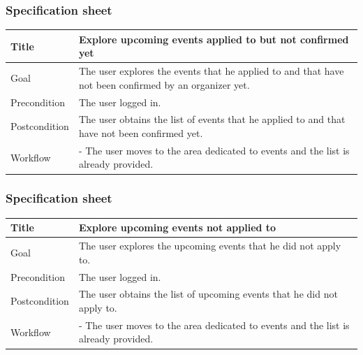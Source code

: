 \documentclass{beamer}
\begin{document}
\begin{frame}
    \frametitle{Specification sheet}
    \begin{table}
        \tiny
        \begin{tabular}{|p{2cm}|p{6cm}|}
        \hline
        Title & \textbf{Explore upcoming events applied to but not confirmed yet} \\
        \hline
        Goal & The user explores the events that he applied to 
        and that have not been confirmed by an organizer yet. \\
        \hline
        Precondition & The user logged in. \\
        \hline
        Postcondition & The user obtains the list of events that he 
        applied to and that have not been confirmed yet. \\
        \hline
        Workflow &
        - The user moves to the area dedicated to events and the list is already provided. \\
        \hline
        \end{tabular}
    \end{table}
\end{frame}


\begin{frame}
    \frametitle{Specification sheet}
    \begin{table}
        \tiny
        \begin{tabular}{|p{2cm}|p{6cm}|}
        \hline
        Title & \textbf{Explore upcoming events not applied to} \\
        \hline
        Goal & The user explores the upcoming events that he did not apply to. \\
        \hline
        Precondition & The user logged in. \\
        \hline
        Postcondition & The user obtains the list of upcoming events that he did not apply to. \\
        \hline
        Workflow &
        - The user moves to the area dedicated to events and the list is already provided. \\
        \hline
        \end{tabular}
    \end{table}
\end{frame}
\end{document}

